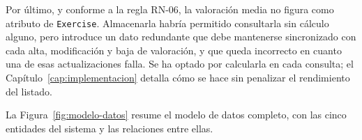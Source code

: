 \documentclass[12pt,a4paper,twoside,openright]{book}
\begin{document}
    Por último, y conforme a la regla RN-06, la valoración media no figura como
    atributo de \texttt{Exercise}. Almacenarla habría permitido consultarla sin
    cálculo alguno, pero introduce un dato redundante que debe mantenerse
    sincronizado con cada alta, modificación y baja de valoración, y que queda
    incorrecto en cuanto una de esas actualizaciones falla. Se ha optado por
    calcularla en cada consulta; el Capítulo~\ref{cap:implementacion} detalla
    cómo se hace sin penalizar el rendimiento del listado.

    La Figura~\ref{fig:modelo-datos} resume el modelo de datos completo, con
    las cinco entidades del sistema y las relaciones entre ellas.

    \begin{figure}[htbp]
        \centering
\end{figure}
\end{document}
